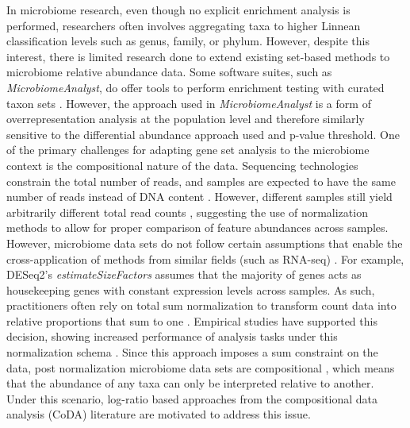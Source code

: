 \documentclass[10pt,letterpaper]{article}
\begin{document}


In microbiome research, even though no explicit enrichment analysis is performed, researchers often involves aggregating taxa to higher Linnean classification levels such as genus, family, or phylum. However, despite this interest, there is limited research done to extend existing set-based methods to microbiome relative abundance data. Some software suites, such as \emph{MicrobiomeAnalyst}, do offer tools to perform enrichment testing with curated taxon sets \cite{chong2020}. However, the approach used in \emph{MicrobiomeAnalyst} is a form of overrepresentation analysis at the population level and therefore similarly sensitive to the differential abundance approach used and p-value threshold. One of the primary challenges for adapting gene set analysis to the microbiome context is the compositional nature of the data. Sequencing technologies constrain the total number of reads, and samples are expected to have the same number of reads instead of DNA content \cite{quinn2019, quinn2018}. However, different samples still yield arbitrarily different total read counts \cite{morton2019, gloor2017}, suggesting the use of normalization methods to allow for proper comparison of feature abundances across samples. However, microbiome data sets do not follow certain assumptions that enable the cross-application of methods from similar fields (such as RNA-seq) \cite{quinn2019, quinn2018}. For example, DESeq2's \emph{estimateSizeFactors} \cite{love2014} assumes that the majority of genes acts as housekeeping genes with constant expression levels across samples. As such, practitioners often rely on total sum normalization to transform count data into relative proportions that sum to one \cite{weiss2017}. Empirical studies have supported this decision, showing increased performance of analysis tasks under this normalization schema \cite{mcknight2019}. Since this approach imposes a sum constraint on the data, post normalization microbiome data sets are compositional \cite{gloor2017}, which means that the abundance of any taxa can only be interpreted relative to another. Under this scenario, log-ratio based approaches from the compositional data analysis (CoDA) literature \cite{aitchison1994} are motivated to address this issue. 
\end{document}
